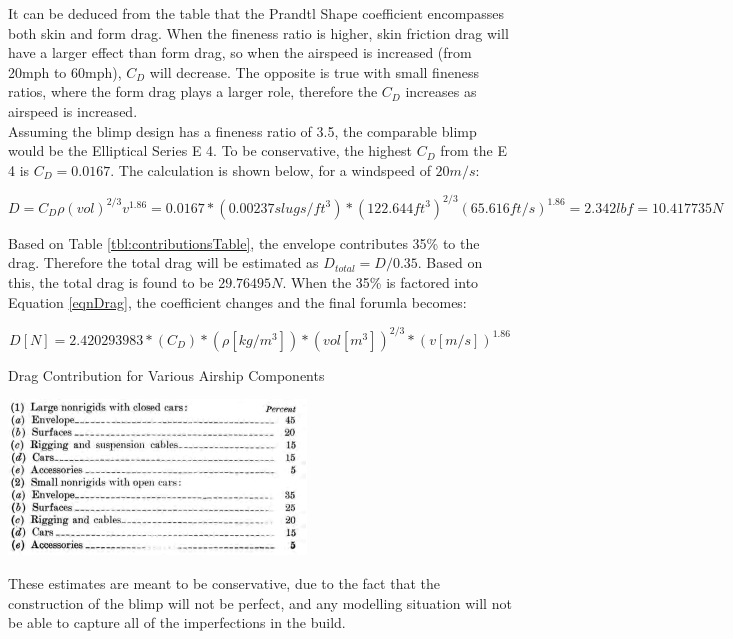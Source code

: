 \documentclass[../main.tex]{subfiles}
\begin{document}
It can be deduced from the table that the Prandtl Shape coefficient encompasses both skin and form drag. When the fineness ratio is higher, skin friction drag will have a larger effect than form drag, so when the airspeed is increased (from 20mph to 60mph), $C_D$ will decrease. The opposite is true with small fineness ratios, where the form drag plays a larger role, therefore the $C_D$ increases as airspeed is increased. \\

Assuming the blimp design has a fineness ratio of 3.5, the comparable blimp would be the Elliptical Series E 4. To be conservative, the highest $C_D$ from the E 4 is $C_D = 0.0167$. The calculation is shown below, for a windspeed of $20m/s$:

\begin{equation*} \label{exDrag}
D = C_D\rho (vol)^{2/3}v^{1.86}=0.0167*(0.00237 slugs/ft^3)*(122.644 ft^3)^{2/3}(65.616 ft/s) ^{1.86} = 2.342 lbf = 10.417735N 
\end{equation*}

Based on Table \ref{tbl:contributionsTable}, the envelope contributes 35\% to the drag. Therefore the total drag will be estimated as $D_{total}=D/0.35$. Based on this, the total drag is found to be $29.76495N$. When the 35\% is factored into Equation \ref{eqnDrag}, the coefficient changes and the final forumla becomes:

\begin{equation} \label{eqnDrag2}
D[N] = 2.420293983*(C_D)*(\rho[kg/m^3])*(vol [m^3])^{2/3}*(v [m/s])^{1.86}
\end{equation}

\begin{table}[H]
	\centering
	\caption{Drag Contribution for Various Airship Components \cite{airshipAerodynamics}}
	\includegraphics[width=.5\linewidth]{img/drag/contributions.PNG}
	\label{tbl:contributionsTable}
\end{table}

These estimates are meant to be conservative, due to the fact that the construction of the blimp will not be perfect, and any modelling situation will not be able to capture all of the imperfections in the build.\\
\end{document}

